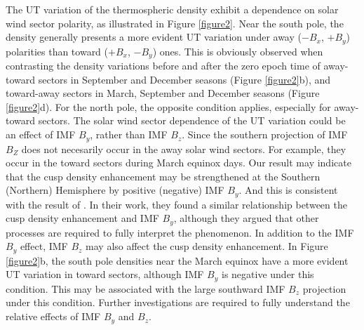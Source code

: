 \documentclass[draft, grl]{/home/guod/Documents/template/agu_template/AGUTeX}
\begin{document}
\begin{article}
    The UT variation of the thermospheric density exhibit a dependence on solar
    wind sector polarity, as illustrated in Figure \ref{figure2}. 
    Near the south pole, the density generally presents a more evident UT 
    variation under away ($-B_x$, $+B_y$) polarities than toward ($+B_x$, 
    $-B_y$) ones.
    This is obviously observed when contrasting the density variations before 
    and after the zero epoch time of away-toward sectors in September and 
    December seasons (Figure \ref{figure2}b), and toward-away sectors in March, 
    September and December seasons (Figure \ref{figure2}d).
    For the north pole, the opposite condition applies, especially for 
    away-toward sectors.
    The solar wind sector dependence of the UT variation could be an effect of
    IMF $B_y$, rather than IMF $B_z$. 
    Since the southern projection of IMF $B_Z$ does not necesarily occur in the
    away solar wind sectors.
    For example, they occur in the toward sectors during March equinox days.
    Our result may indicate that the cusp density enhancement may be 
    strengthened at the Southern (Northern) Hemisphere by positive (negative) 
    IMF $B_y$.
    And this is consistent with the result of \citet{Yamazaki2015a}. 
    In their work, they found a similar relationship between the cusp density 
    enhancement and IMF $B_y$, although they argued that other processes are 
    required to fully interpret the phenomenon.
    In addition to the IMF $B_y$ effect, IMF $B_z$ may also affect the cusp 
    density enhancement. 
    In Figure \ref{figure2}b, the south pole densities near the March equinox
    have a more evident UT variation in toward sectors, although IMF $B_y$ is
    negative under this condition. 
    This may be associated with the large southward IMF $B_z$ projection under 
    this condition.
    Further investigations are required to fully understand the relative effects
    of IMF $B_y$ and $B_z$.


\end{article}
\end{document}
